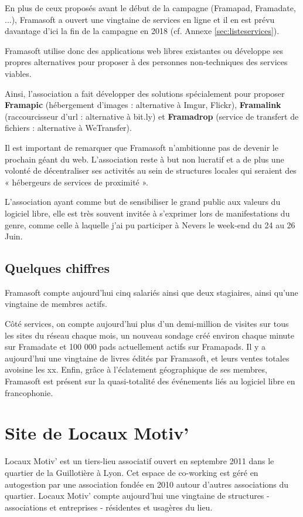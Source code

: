 \documentclass[10pt,a4paper]{report}
\begin{document}
	
	En plus de ceux proposés avant le début de la campagne (Framapad, Framadate, ...), Framasoft a ouvert une vingtaine de services en ligne et il en est prévu davantage d'ici la fin de la campagne en 2018 (cf. Annexe \ref{sec:listeservices}).
	
	Framasoft utilise donc des applications web libres existantes ou développe ses propres alternatives pour proposer à des personnes non-techniques des services viables.
	
	Ainsi, l'association a fait développer des solutions spécialement pour proposer \textbf{Framapic} (hébergement d'images : alternative à Imgur, Flickr), \textbf{Framalink} (raccourcisseur d'url : alternative à bit.ly) et \textbf{Framadrop} (service de transfert de fichiers : alternative à WeTransfer).
	
	Il est important de remarquer que Framasoft n'ambitionne pas de devenir le prochain géant du web. L'association reste à but non lucratif et a de plus une volonté de décentraliser ses activités au sein de structures locales qui seraient des « hébergeurs de services de proximité ».
	
	L'association ayant comme but de sensibiliser le grand public aux valeurs du logiciel libre, elle est très souvent invitée à s'exprimer lors de manifestations du genre, comme celle à laquelle j'ai pu participer à Nevers le week-end du 24 au 26 Juin.
	
	\subsection{Quelques chiffres}
	Framasoft compte aujourd'hui cinq salariés ainsi que deux stagiaires, ainsi qu'une vingtaine de membres actifs. 
	
	Côté services, on compte aujourd'hui plus d'un demi-million de visites sur tous les sites du réseau chaque mois, un nouveau sondage créé environ chaque minute sur Framadate et 100 000 pads actuellement actifs sur Framapads. Il y a aujourd'hui une vingtaine de livres édités par Framasoft, et leurs ventes totales avoisine les xx. Enfin, grâce à l'éclatement géographique de ses membres, Framasoft est présent sur la quasi-totalité des événements liés au logiciel libre en francophonie.
	
	\section{Site de Locaux Motiv'}
	Locaux Motiv' est un tiers-lieu associatif ouvert en septembre 2011 dans le quartier de la Guillotière à Lyon. Cet espace de co-working est géré en autogestion par une association fondée en 2010 autour d'autres associations du quartier. Locaux Motiv' compte aujourd’hui une vingtaine de structures - associations et entreprises - résidentes et usagères du lieu.
	
\end{document}

